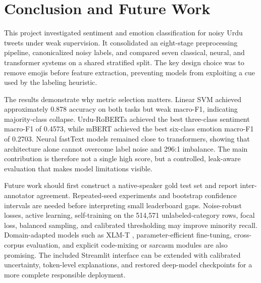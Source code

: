 \documentclass[conference]{IEEEtran}
\begin{document}
\FloatBarrier

\section{Conclusion and Future Work}
This project investigated sentiment and emotion classification for noisy Urdu tweets under weak supervision. It consolidated an eight-stage preprocessing pipeline, canonicalized noisy labels, and compared seven classical, neural, and transformer systems on a shared stratified split. The key design choice was to remove emojis before feature extraction, preventing models from exploiting a cue used by the labeling heuristic.

The results demonstrate why metric selection matters. Linear SVM achieved approximately 0.878 accuracy on both tasks but weak macro-F1, indicating majority-class collapse. Urdu-RoBERTa achieved the best three-class sentiment macro-F1 of 0.4573, while mBERT achieved the best six-class emotion macro-F1 of 0.2703. Neural fastText models remained close to transformers, showing that architecture alone cannot overcome label noise and 296:1 imbalance. The main contribution is therefore not a single high score, but a controlled, leak-aware evaluation that makes model limitations visible.

Future work should first construct a native-speaker gold test set and report inter-annotator agreement. Repeated-seed experiments and bootstrap confidence intervals are needed before interpreting small leaderboard gaps. Noise-robust losses, active learning, self-training on the 514,571 unlabeled-category rows, focal loss, balanced sampling, and calibrated thresholding may improve minority recall. Domain-adapted models such as XLM-T \cite{barbieri2022xlmt}, parameter-efficient fine-tuning, cross-corpus evaluation, and explicit code-mixing or sarcasm modules are also promising. The included Streamlit interface can be extended with calibrated uncertainty, token-level explanations, and restored deep-model checkpoints for a more complete responsible deployment.



\end{document}
